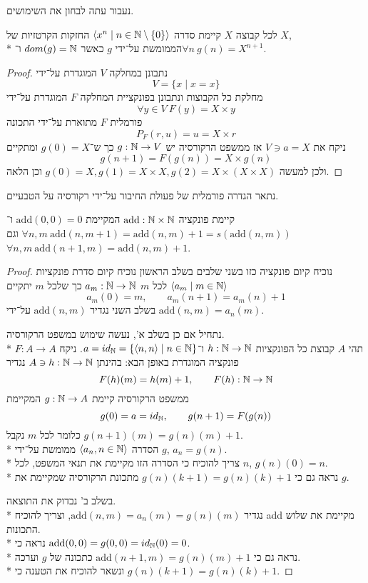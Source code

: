 נעבור עתה לבחון את השימושים.
\begin{theorem}
	לכל קבוצה $X$ קיימת סדרה $\langle x^n \mid n \in \mathbb{N} \setminus \{0\}\rangle$ החזקות הקרטזיות של $X$, \\*
	הממומשת על־ידי $g$ כאשר $dom(g) = \mathbb{N}$ ו־$\forall n\ g(n) = X^{n + 1}$.
\end{theorem}
\begin{proof}
	נתבונן במחלקה $V$ המוגדרת על־ידי
	\[
		V = \{ x \mid x = x \}
	\]
	מחלקת כל הקבוצות ונתבונן בפונקציית המחלקה $F$ המוגדרת על־ידי
	\[
		\forall y \in V\ F(y) = X \times y
	\]
	פורמלית $F$ מתוארת על־ידי התכונה
	\[
		P_F(r, u) = u = X \times r
	\]
	ניקח את $V \ni a = X$ אז ממשפט הרקורסיה יש $g : \mathbb{N} \to V$ כך ש־$g(0) = X$ ומתקיים
	\[
		g(n + 1) = F(g(n)) = X \times g(n)
	\]
	ולכן למעשה $g(0) = X, g(1) = X \times X, g(2) = X \times (X \times X)$ וכן הלאה.
\end{proof}
נתאר הגדרה פורמלית של פעולת החיבור על־ידי רקורסיה על הטבעיים.
\begin{theorem}
	קיימת פונקציה $\text{add} : \mathbb{N} \times \mathbb{N}$ המקיימת $\text{add}(0, 0) = 0$
	ו־$\forall n, m\ \text{add}(n, m + 1) = \text{add}(n, m) + 1 = s(\text{add}(n, m))$
	וגם $\forall n, m\ \text{add}(n + 1, m) = \text{add}(n, m) + 1$.
\end{theorem}
\begin{proof}
	נוכיח קיום פונקציה כזו בשני שלבים
	בשלב הראשון נוכיח קיום סדרת פונקציות $\langle a_m \mid m \in \mathbb{N} \rangle$ לכל $m$ $a_m : \mathbb{N} \to \mathbb{N}$
	כך שלכל $m$ יתקיים
	\[
		a_m(0) = m,
		\qquad
		a_m(n + 1) = a_m(n) + 1
	\]
	בשלב השני נגדיר $\text{add}(n, m)$ על־ידי $\text{add}(n, m) = a_n(m)$.

	נתחיל אם כן בשלב א', נעשה שימוש במשפט הרקורסיה. \\*
	תהי $A$ קבוצת כל הפונקציות $h : \mathbb{N} \to \mathbb{N}$ ו־$a = id_{\mathbb{N}} = \{ \langle n, n \rangle \mid n \in \mathbb{N} \}$.
	ניקח $F : A \to A$ פונקציה המוגדרת באופן הבא: בהינתן $A \ni h : \mathbb{N} \to \mathbb{N}$ נגדיר
	\[
		F(h)(m) = h(m) + 1,
		\qquad
		F(h) : \mathbb{N} \to \mathbb{N}
	\]
	ממשפט הרקורסיה קיימת $g : \mathbb{N} \to A$ המקיימת
	\[
		g(0) = a = id_{\mathbb{N}},
		\qquad
		g(n + 1) = F(g(n))
	\]
	כלומר לכל $m$ נקבל $g(n + 1)(m) = g(n)(m) + 1$. \\*
	הסדרה $\langle a_n, n \in \mathbb{N} \rangle$ ממומשת על־ידי $g$, $a_n = g(n)$. \\*
	צריך להוכיח כי הסדרה הזו מקיימת את תנאי המשפט, לכל $n$, $g(n)(0) = n$. \\*
	נראה גם כי $g(n)(k + 1) = g(n)(k) + 1$ מתכונת הרקורסיה שמקיימת את $g$.

	בשלב ב' נבדוק את התוצאה. \\*
	נגדיר $\text{add}(n, m) = a_n(m) = g(n)(m)$, וצריך להוכיח add מקיימת את שלוש התכונות. \\*
	נראה כי $\text{add}(0, 0) = g(0, 0) = id_{\mathbb{N}}(0) = 0$. \\*
	נראה גם כי $\text{add}(n + 1, m) = g(n)(m) + 1$ כתכונה של $g$ וערכה. \\*
	ונשאר להוכיח את הטענה כי $g(n)(k + 1) = g(n)(k) + 1$.
\end{proof}
